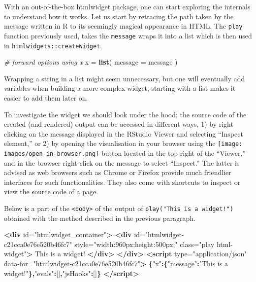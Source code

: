 \documentclass[10pt,]{krantz}
\makeatletter
\newenvironment{Shaded}{\begin{snugshade}}{\end{snugshade}}
\newcommand{\CommentTok}[1]{\textcolor[rgb]{0.37,0.37,0.37}{\textit{#1}}}
\newcommand{\DataTypeTok}[1]{\textcolor[rgb]{0.27,0.27,0.27}{#1}}
\newcommand{\KeywordTok}[1]{\textcolor[rgb]{0.27,0.27,0.27}{\textbf{#1}}}
\newcommand{\NormalTok}[1]{#1}
\newcommand{\OperatorTok}[1]{\textcolor[rgb]{0.43,0.43,0.43}{\textbf{#1}}}
\newcommand{\OtherTok}[1]{\textcolor[rgb]{0.37,0.37,0.37}{#1}}
\newcommand{\StringTok}[1]{\textcolor[rgb]{0.5,0.5,0.5}{#1}}
\newenvironment{kframe}{%
\medskip{}
\setlength{\fboxsep}{.8em}
 \def\at@end@of@kframe{}%
 \ifinner\ifhmode%
  \def\at@end@of@kframe{\end{minipage}}%
  \begin{minipage}{\columnwidth}%
 \fi\fi%
 \def\FrameCommand##1{\hskip\@totalleftmargin \hskip-\fboxsep
 \colorbox{shadecolor}{##1}\hskip-\fboxsep
     \hskip-\linewidth \hskip-\@totalleftmargin \hskip\columnwidth}%
 \MakeFramed {\advance\hsize-\width
   \@totalleftmargin\z@ \linewidth\hsize
   \@setminipage}}%
 {\par\unskip\endMakeFramed%
 \at@end@of@kframe}
\renewenvironment{Shaded}{\begin{kframe}}{\end{kframe}}
\makeatother
\begin{document}
With an out-of-the-box htmlwidget package, one can start exploring the internals to understand how it works. Let us start by retracing the path taken by the message written in R to its seemingly magical appearance in HTML. The \texttt{play} function previously used, takes the \texttt{message} wraps it into a list which is then used in \texttt{htmlwidgets::createWidget}.

\begin{Shaded}
\begin{Highlighting}[]
\CommentTok{# forward options using x}
\NormalTok{x =}\StringTok{ }\KeywordTok{list}\NormalTok{(}
  \DataTypeTok{message =}\NormalTok{ message}
\NormalTok{)}
\end{Highlighting}
\end{Shaded}

Wrapping a string in a list might seem unnecessary, but one will eventually add variables when building a more complex widget, starting with a list makes it easier to add them later on.

To investigate the widget we should look under the hood; the source code of the created (and rendered) output can be accessed in different ways, 1) by right-clicking on the message displayed in the RStudio Viewer and selecting ``Inspect element,'' or 2) by opening the visualisation in your browser using the \texttt{[image: images/open-in-browser.png]} button located in the top right of the ``Viewer,'' and in the browser right-click on the message to select ``Inspect.'' The latter is advised as web browsers such as Chrome or Firefox provide much friendlier interfaces for such functionalities. They also come with shortcuts to inspect or view the source code of a page.

Below is a part of the \texttt{\textless{}body\textgreater{}} of the output of \texttt{play("This\ is\ a\ widget!")} obtained with the method described in the previous paragraph.

\begin{Shaded}
\begin{Highlighting}[]
\KeywordTok{<div}\OtherTok{ id=}\StringTok{"htmlwidget_container"}\KeywordTok{>}
  \KeywordTok{<div} 
\OtherTok{    id=}\StringTok{"htmlwidget-c21cca0e76e520b46fc7"} 
\OtherTok{    style=}\StringTok{"width:960px;height:500px;"} 
\OtherTok{    class=}\StringTok{"play html-widget"}\KeywordTok{>}
\NormalTok{    This is a widget!}
  \KeywordTok{</div>}
\KeywordTok{</div>}
\KeywordTok{<script} 
\OtherTok{  type=}\StringTok{"application/json"} 
\OtherTok{  data-for=}\StringTok{"htmlwidget-c21cca0e76e520b46fc7"}\KeywordTok{>}
  \OperatorTok{\{}\StringTok{"x"}\OperatorTok{:\{}\StringTok{"message"}\OperatorTok{:}\StringTok{"This is a widget!"}\OperatorTok{\},}\StringTok{"evals"}\OperatorTok{:}\NormalTok{[]}\OperatorTok{,}\StringTok{"jsHooks"}\OperatorTok{:}\NormalTok{[]}\OperatorTok{\}}
\KeywordTok{</script>}
\end{Highlighting}
\end{Shaded}
\end{document}
